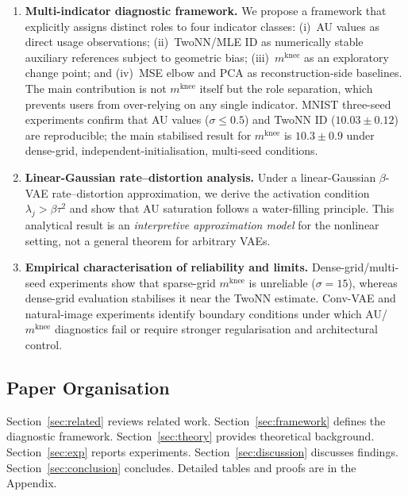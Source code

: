 \documentclass[11pt,a4paper]{article}
\newcommand{\mknee}{m^{\mathrm{knee}}}
\begin{document}
\begin{enumerate}
\item \textbf{Multi-indicator diagnostic framework.}
We propose a framework that explicitly assigns distinct roles to four
indicator classes: (i)~AU values as direct usage observations; (ii)~TwoNN/MLE
ID as numerically stable auxiliary references subject to geometric bias;
(iii)~$\mknee$ as an exploratory change point; and (iv)~MSE elbow and PCA as
reconstruction-side baselines.
The main contribution is not $\mknee$ itself but the role separation, which
prevents users from over-relying on any single indicator.
MNIST three-seed experiments confirm that AU values ($\sigma\!\leq\!0.5$) and
TwoNN ID ($10.03\pm0.12$) are reproducible; the main stabilised result for
$\mknee$ is $10.3\pm0.9$ under dense-grid, independent-initialisation,
multi-seed conditions.

\item \textbf{Linear-Gaussian rate--distortion analysis.}
Under a linear-Gaussian $\beta$-VAE rate--distortion approximation, we derive
the activation condition $\lambda_j>\beta\tau^2$ and show that AU saturation
follows a water-filling principle.
This analytical result is an \emph{interpretive approximation model} for the
nonlinear setting, not a general theorem for arbitrary VAEs.

\item \textbf{Empirical characterisation of reliability and limits.}
Dense-grid/multi-seed experiments show that sparse-grid $\mknee$ is unreliable
($\sigma=15$), whereas dense-grid evaluation stabilises it near the TwoNN
estimate.
Conv-VAE and natural-image experiments identify boundary conditions under which
AU/$\mknee$ diagnostics fail or require stronger regularisation and architectural
control.
\end{enumerate}

\subsection{Paper Organisation}\label{sec:intro_org}

Section~\ref{sec:related} reviews related work.
Section~\ref{sec:framework} defines the diagnostic framework.
Section~\ref{sec:theory} provides theoretical background.
Section~\ref{sec:exp} reports experiments.
Section~\ref{sec:discussion} discusses findings.
Section~\ref{sec:conclusion} concludes.
Detailed tables and proofs are in the Appendix.

\end{document}
